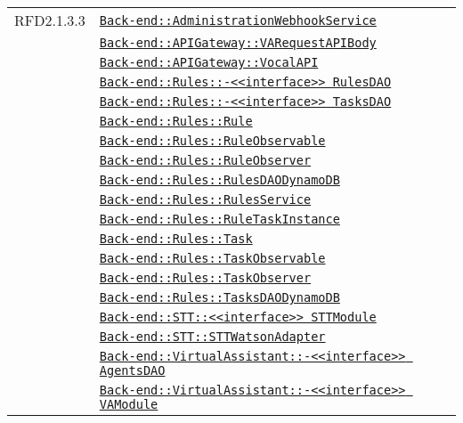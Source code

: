 \begin{longtable}{|>{\centering}m{3cm}|m{10cm}<{\centering}|}
RFD2.1.3.3 & \hyperref[Back-end::AdministrationWebhookService]{\texttt{Back-end::AdministrationWebhookService}}\\
& \hyperref[Back-end::APIGateway::VARequestAPIBody]{\texttt{Back-end::APIGateway::VARequestAPIBody}}\\
& \hyperref[Back-end::APIGateway::VocalAPI]{\texttt{Back-end::APIGateway::VocalAPI}}\\
& \hyperref[Back-end::Rules::<<interface>> RulesDAO]{\texttt{Back-end::Rules::-\linebreak <<interface>> RulesDAO}}\\
& \hyperref[Back-end::Rules::<<interface>> TasksDAO]{\texttt{Back-end::Rules::-\linebreak <<interface>> TasksDAO}}\\
& \hyperref[Back-end::Rules::Rule]{\texttt{Back-end::Rules::Rule}}\\
& \hyperref[Back-end::Rules::RuleObservable]{\texttt{Back-end::Rules::RuleObservable}}\\
& \hyperref[Back-end::Rules::RuleObserver]{\texttt{Back-end::Rules::RuleObserver}}\\
& \hyperref[Back-end::Rules::RulesDAODynamoDB]{\texttt{Back-end::Rules::RulesDAODynamoDB}}\\
& \hyperref[Back-end::Rules::RulesService]{\texttt{Back-end::Rules::RulesService}}\\
& \hyperref[Back-end::Rules::RuleTaskInstance]{\texttt{Back-end::Rules::RuleTaskInstance}}\\
& \hyperref[Back-end::Rules::Task]{\texttt{Back-end::Rules::Task}}\\
& \hyperref[Back-end::Rules::TaskObservable]{\texttt{Back-end::Rules::TaskObservable}}\\
& \hyperref[Back-end::Rules::TaskObserver]{\texttt{Back-end::Rules::TaskObserver}}\\
& \hyperref[Back-end::Rules::TasksDAODynamoDB]{\texttt{Back-end::Rules::TasksDAODynamoDB}}\\
& \hyperref[Back-end::STT::<<interface>> STTModule]{\texttt{Back-end::STT::<<interface>> STTModule}}\\
& \hyperref[Back-end::STT::STTWatsonAdapter]{\texttt{Back-end::STT::STTWatsonAdapter}}\\
& \hyperref[Back-end::VirtualAssistant::<<interface>> AgentsDAO]{\texttt{Back-end::VirtualAssistant::-\linebreak <<interface>> AgentsDAO}}\\
& \hyperref[Back-end::VirtualAssistant::<<interface>> VAModule]{\texttt{Back-end::VirtualAssistant::-\linebreak <<interface>> VAModule}}\\

\end{longtable}
